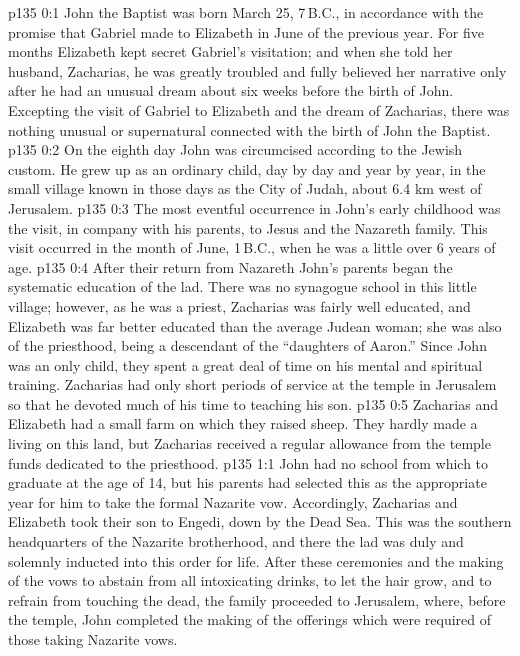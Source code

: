 \author{Midwayer Commission}
\vs p135 0:1 John the Baptist was born March 25, 7\,B.C., in accordance with the promise that Gabriel made to Elizabeth in June of the previous year. For five months Elizabeth kept secret Gabriel’s visitation; and when she told her husband, Zacharias, he was greatly troubled and fully believed her narrative only after he had an unusual dream about six weeks before the birth of John. Excepting the visit of Gabriel to Elizabeth and the dream of Zacharias, there was nothing unusual or supernatural connected with the birth of John the Baptist.
\vs p135 0:2 On the eighth day John was circumcised according to the Jewish custom. He grew up as an ordinary child, day by day and year by year, in the small village known in those days as the City of Judah, about 6.4 km west of Jerusalem.
\vs p135 0:3 The most eventful occurrence in John’s early childhood was the visit, in company with his parents, to Jesus and the Nazareth family. This visit occurred in the month of June, 1\,B.C., when he was a little over 6 years of age.
\vs p135 0:4 After their return from Nazareth John’s parents began the systematic education of the lad. There was no synagogue school in this little village; however, as he was a priest, Zacharias was fairly well educated, and Elizabeth was far better educated than the average Judean woman; she was also of the priesthood, being a descendant of the “daughters of Aaron.” Since John was an only child, they spent a great deal of time on his mental and spiritual training. Zacharias had only short periods of service at the temple in Jerusalem so that he devoted much of his time to teaching his son.
\vs p135 0:5 Zacharias and Elizabeth had a small farm on which they raised sheep. They hardly made a living on this land, but Zacharias received a regular allowance from the temple funds dedicated to the priesthood.
\vs p135 1:1 John had no school from which to graduate at the age of 14, but his parents had selected this as the appropriate year for him to take the formal Nazarite vow. Accordingly, Zacharias and Elizabeth took their son to Engedi, down by the Dead Sea. This was the southern headquarters of the Nazarite brotherhood, and there the lad was duly and solemnly inducted into this order for life. After these ceremonies and the making of the vows to abstain from all intoxicating drinks, to let the hair grow, and to refrain from touching the dead, the family proceeded to Jerusalem, where, before the temple, John completed the making of the offerings which were required of those taking Nazarite vows.
